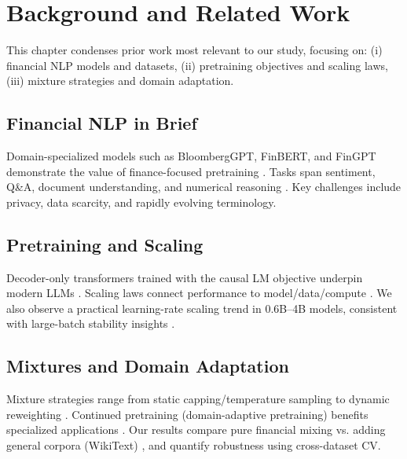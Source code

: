 \chapter{Background and Related Work}

This chapter condenses prior work most relevant to our study, focusing on: (i) financial NLP models and datasets, (ii) pretraining objectives and scaling laws, (iii) mixture strategies and domain adaptation.

\section{Financial NLP in Brief}
Domain-specialized models such as BloombergGPT, FinBERT, and FinGPT demonstrate the value of finance-focused pretraining \parencite{wu2023bloomberggpt, araci2019finbert, yang2020finbert, yang2023fingpt}. Tasks span sentiment, Q\&A, document understanding, and numerical reasoning \parencite{yang2020finqa}. Key challenges include privacy, data scarcity, and rapidly evolving terminology.

\section{Pretraining and Scaling}
Decoder-only transformers trained with the causal LM objective underpin modern LLMs \parencite{radford2019language, brown2020language, touvron2023llama}. Scaling laws connect performance to model/data/compute \parencite{kaplan2020scaling, hoffmann2022training}. We also observe a practical learning-rate scaling trend in 0.6B--4B models, consistent with large-batch stability insights \parencite{mccandlish2018empirical}.

\section{Mixtures and Domain Adaptation}
Mixture strategies range from static capping/temperature sampling to dynamic reweighting \parencite{longpre2023pretrainer, arivazhagan2019massively, raffel2020exploring, xie2023doremi}. Continued pretraining (domain-adaptive pretraining) benefits specialized applications \parencite{gururangan2020don}. Our results compare pure financial mixing vs. adding general corpora (WikiText) \parencite{gao2020pile}, and quantify robustness using cross-dataset CV.

